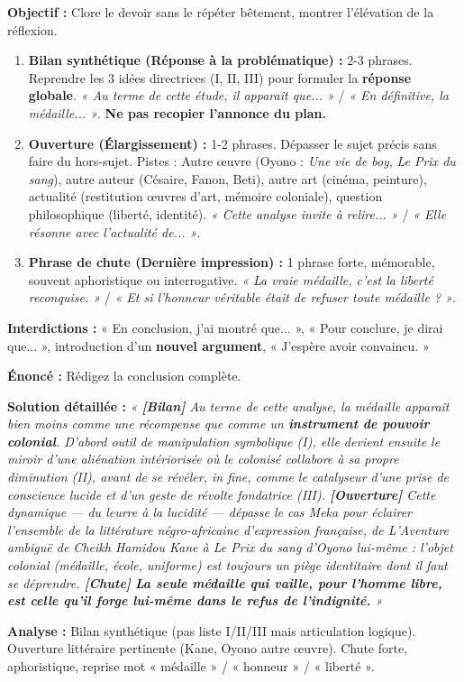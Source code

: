 \documentclass[11pt]{article}
\begin{document}
\begin{methode}
\textbf{Objectif :} Clore le devoir sans le répéter bêtement, montrer l'élévation de la réflexion.
\begin{enumerate}
    \item \textbf{Bilan synthétique (Réponse à la problématique) :} 2-3 phrases. Reprendre les 3 idées directrices (I, II, III) pour formuler la \textbf{réponse globale}. \emph{« Au terme de cette étude, il apparaît que... »} / \emph{« En définitive, la médaille... »}. \textbf{Ne pas recopier l'annonce du plan.}
    \item \textbf{Ouverture (Élargissement) :} 1-2 phrases. Dépasser le sujet précis sans faire du hors-sujet. Pistes : Autre œuvre (Oyono : \emph{Une vie de boy}, \emph{Le Prix du sang}), autre auteur (Césaire, Fanon, Beti), autre art (cinéma, peinture), actualité (restitution œuvres d'art, mémoire coloniale), question philosophique (liberté, identité). \emph{« Cette analyse invite à relire... »} / \emph{« Elle résonne avec l'actualité de... »}.
    \item \textbf{Phrase de chute (Dernière impression) :} 1 phrase forte, mémorable, souvent aphoristique ou interrogative. \emph{« La vraie médaille, c'est la liberté reconquise. »} / \emph{« Et si l'honneur véritable était de refuser toute médaille ? »}.
\end{enumerate}
\textbf{Interdictions :} « En conclusion, j'ai montré que... », « Pour conclure, je dirai que... », introduction d'un \textbf{nouvel argument}, « J'espère avoir convaincu. »
\end{methode}

\begin{exoresolu}
\textbf{Énoncé :} Rédigez la conclusion complète.

\tcblower
\textbf{Solution détaillée :}
\emph{« \textbf{[Bilan]} Au terme de cette analyse, la médaille apparaît bien moins comme une récompense que comme un \textbf{instrument de pouvoir colonial}. D'abord outil de manipulation symbolique (I), elle devient ensuite le miroir d'une aliénation intériorisée où le colonisé collabore à sa propre diminution (II), avant de se révéler, in fine, comme le catalyseur d'une prise de conscience lucide et d'un geste de révolte fondatrice (III). \textbf{[Ouverture]} Cette dynamique — du leurre à la lucidité — dépasse le cas Meka pour éclairer l'ensemble de la littérature négro-africaine d'expression française, de \emph{L'Aventure ambiguë} de Cheikh Hamidou Kane à \emph{Le Prix du sang} d'Oyono lui-même : l'objet colonial (médaille, école, uniforme) est toujours un piège identitaire dont il faut se déprendre. \textbf{[Chute]} \textbf{La seule médaille qui vaille, pour l'homme libre, est celle qu'il forge lui-même dans le refus de l'indignité.} »}

\textbf{Analyse :} Bilan synthétique (pas liste I/II/III mais articulation logique). Ouverture littéraire pertinente (Kane, Oyono autre œuvre). Chute forte, aphoristique, reprise mot « médaille » / « honneur » / « liberté ».
\end{exoresolu}
\end{document}
